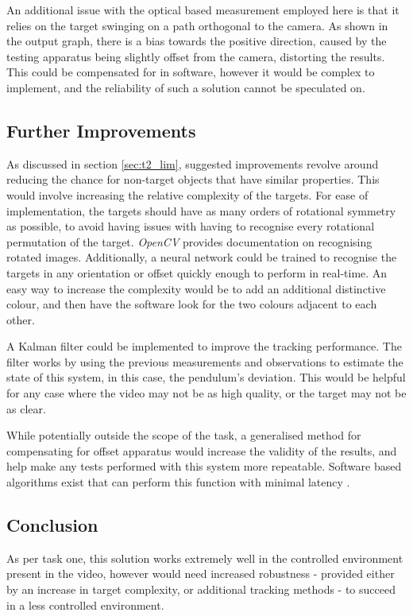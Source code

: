 \documentclass[conference]{IEEEtran}
\begin{document}
An additional issue with the optical based measurement employed here is that it relies on the target swinging on a path orthogonal to the camera. As shown in the output graph, there is a bias towards the positive direction, caused by the testing apparatus being slightly offset from the camera, distorting the results. This could be compensated for in software, however  it would be complex to implement, and the reliability of such a solution cannot be speculated on.
\subsection{Further Improvements}
As discussed in section \ref{sec:t2_lim}, suggested improvements revolve around reducing the chance for non-target objects that have similar properties. This would involve increasing the relative complexity of the targets. For ease of implementation, the targets should have as many orders of rotational symmetry as possible, to avoid having issues with having to recognise every rotational permutation of the target. \textit{OpenCV} provides documentation on recognising rotated images\cite{OpenCV_Rotate}. Additionally, a neural network could be trained to recognise the targets in any orientation or offset quickly enough to perform in real-time\cite{google}. An easy way to increase the complexity would be to add an additional distinctive colour, and then have the software look for the two colours adjacent to each other.

A Kalman filter could be implemented to improve the tracking performance\cite{Kalman}. The filter works by using the previous measurements and observations to estimate the state of this system, in this case, the pendulum's deviation. This would be helpful for any case where the video may not be as high quality, or the target may not be as clear.

While potentially outside the scope of the task, a generalised method for compensating for offset apparatus would increase the validity of the results, and help make any tests performed with this system more repeatable. Software based algorithms exist that can perform this function with minimal latency \cite{5138693}. 
\subsection{Conclusion}
As per task one, this solution works extremely well in the controlled environment present in the video, however would need increased robustness - provided either by an increase in target complexity, or additional tracking methods - to succeed in a less controlled environment.
\end{document}
